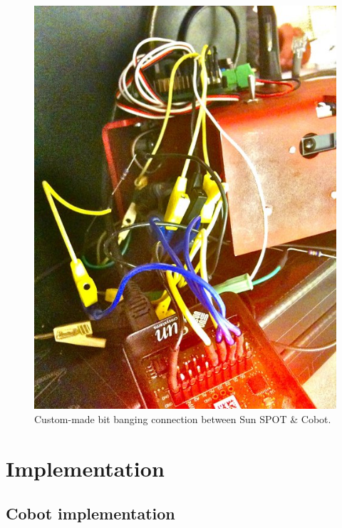 \documentclass[a4paper,10pt]{article} %
\begin{document}
\begin{figure}[H]
\label{fig:cobot-sun-spot}
\centering
\includegraphics[scale=0.5]{img/cobot_and_sunspot.jpg}
\caption{Custom-made bit banging connection between Sun SPOT \& Cobot.}
\end{figure}




\pagebreak

\section{Implementation} %
\label{sec:Implementation}

\subsection{Cobot implementation} %
\label{sub:Cobot implementation}
\end{document}
